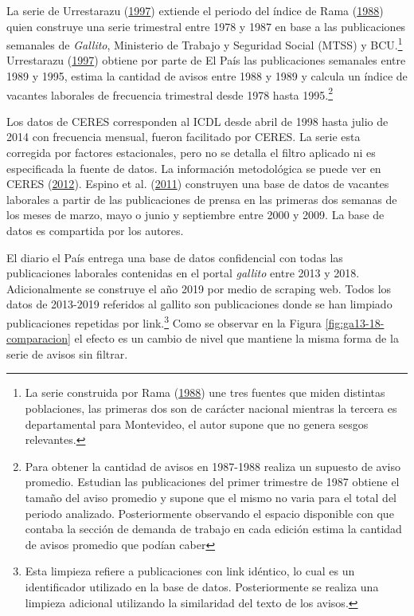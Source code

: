 \documentclass[12pt,oneside]{reedthesis}
\begin{document}
La serie de Urrestarazu (\protect\hyperlink{ref-Urrestarazu1997}{1997}) extiende el periodo del índice de Rama (\protect\hyperlink{ref-Rama1988}{1988}) quien construye una serie trimestral entre 1978 y 1987 en base a las publicaciones semanales de \emph{Gallito}, Ministerio de Trabajo y Seguridad Social (MTSS) y BCU.\footnote{La serie construida por Rama (\protect\hyperlink{ref-Rama1988}{1988}) une tres fuentes que miden distintas poblaciones, las primeras dos son de carácter nacional mientras la tercera es departamental para Montevideo, el autor supone que no genera sesgos relevantes.} Urrestarazu (\protect\hyperlink{ref-Urrestarazu1997}{1997}) obtiene por parte de El País las publicaciones semanales entre 1989 y 1995, estima la cantidad de avisos entre 1988 y 1989 y calcula un índice de vacantes laborales de frecuencia trimestral desde 1978 hasta 1995.\footnote{Para obtener la cantidad de avisos en 1987-1988 realiza un supuesto de aviso promedio. Estudian las publicaciones del primer trimestre de 1987 obtiene el tamaño del aviso promedio y supone que el mismo no varia para el total del periodo analizado. Posteriormente observando el espacio disponible con que contaba la sección de demanda de trabajo en cada edición estima la cantidad de avisos promedio que podían caber}

Los datos de CERES corresponden al ICDL desde abril de 1998 hasta julio de 2014 con frecuencia mensual, fueron facilitado por CERES. La serie esta corregida por factores estacionales, pero no se detalla el filtro aplicado ni es especificada la fuente de datos. La información metodológica se puede ver en CERES (\protect\hyperlink{ref-Ceres2012}{2012}). Espino et al. (\protect\hyperlink{ref-Alma2011}{2011}) construyen una base de datos de vacantes laborales a partir de las publicaciones de prensa en las primeras dos semanas de los meses de marzo, mayo o junio y septiembre entre 2000 y 2009. La base de datos es compartida por los autores.

El diario el País entrega una base de datos confidencial con todas las publicaciones laborales contenidas en el portal \emph{gallito} entre 2013 y 2018. Adicionalmente se construye el año 2019 por medio de scraping web. Todos los datos de 2013-2019 referidos al gallito son publicaciones donde se han limpiado publicaciones repetidas por link.\footnote{Esta limpieza refiere a publicaciones con link idéntico, lo cual es un identificador utilizado en la base de datos. Posteriormente se realiza una limpieza adicional utilizando la similaridad del texto de los avisos.} Como se observar en la Figura \ref{fig:ga13-18-comparacion} el efecto es un cambio de nivel que mantiene la misma forma de la serie de avisos sin filtrar.
\end{document}
